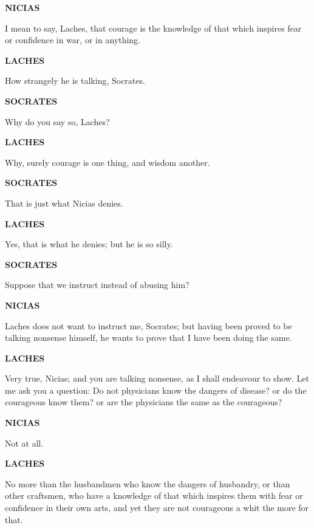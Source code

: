 \documentclass[11pt,letter]{article}
\begin{document}
\par \textbf{NICIAS}
\par   I mean to say, Laches, that courage is the knowledge of that which inspires fear or confidence in war, or in anything.

\par \textbf{LACHES}
\par   How strangely he is talking, Socrates.

\par \textbf{SOCRATES}
\par   Why do you say so, Laches?

\par \textbf{LACHES}
\par   Why, surely courage is one thing, and wisdom another.

\par \textbf{SOCRATES}
\par   That is just what Nicias denies.

\par \textbf{LACHES}
\par   Yes, that is what he denies; but he is so silly.

\par \textbf{SOCRATES}
\par   Suppose that we instruct instead of abusing him?

\par \textbf{NICIAS}
\par   Laches does not want to instruct me, Socrates; but having been proved to be talking nonsense himself, he wants to prove that I have been doing the same.

\par \textbf{LACHES}
\par   Very true, Nicias; and you are talking nonsense, as I shall endeavour to show. Let me ask you a question:  Do not physicians know the dangers of disease? or do the courageous know them? or are the physicians the same as the courageous?

\par \textbf{NICIAS}
\par   Not at all.

\par \textbf{LACHES}
\par   No more than the husbandmen who know the dangers of husbandry, or than other craftsmen, who have a knowledge of that which inspires them with fear or confidence in their own arts, and yet they are not courageous a whit the more for that.
\end{document}
